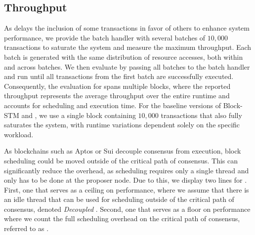 



\subsection{Throughput}



As \sys delays the inclusion of some transactions in favor of others to enhance system performance, we provide the batch handler with several batches of $10{,}000$ transactions to saturate the system and measure the maximum throughput. Each batch is generated with the same distribution of resource accesses, both within and across batches. We then evaluate \sys by passing all batches to the batch handler and run \sys until all transactions from the first batch are successfully executed. Consequently, the evaluation for \sys spans multiple blocks, where the reported throughput represents the average throughput over the entire runtime and accounts for scheduling and execution time.
For the baseline versions of Block-STM and \basesys, we use a single block containing $10{,}000$ transactions that also fully saturates the system, with runtime variations dependent solely on the specific workload.  


As blockchains such as Aptos or Sui decouple consensus from execution, block scheduling could be moved outside of the critical path of consensus. This can significantly reduce the overhead, as scheduling requires only a single thread and only has to be done at the proposer node. Due to this, we display two lines for \sys. First, one that serves as a ceiling on performance, where we assume that there is an idle thread that can be used for scheduling outside of the critical path of consensus, denoted \textit{Decoupled \sys}. Second, one that serves as a floor on performance where we count the full scheduling overhead on the critical path of consensus, referred to as \textit{\sys}.

